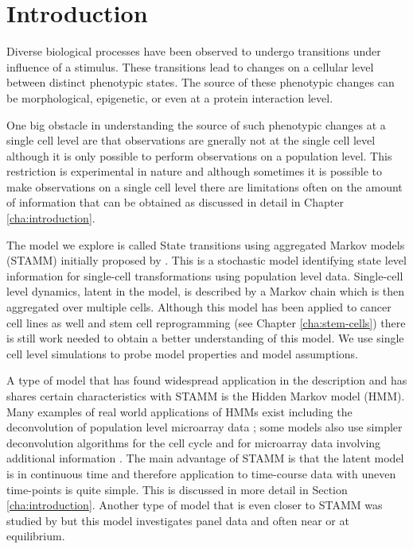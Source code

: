 \section{Introduction}
\label{sec:intro-stamm}

Diverse biological processes have been observed to undergo transitions under influence of a stimulus. These transitions lead to changes on a cellular level between distinct phenotypic states. The source of these phenotypic changes can be morphological, epigenetic, or even at a protein interaction level.

One big obstacle in understanding the source of such phenotypic changes at a single cell level are that observations are gnerally not at the single cell level although it is only possible to perform observations on a population level. This restriction is experimental in nature and although sometimes it is possible to make observations on a single cell level there are limitations often on the amount of information that can be obtained as discussed in detail in Chapter \ref{cha:introduction}. 

The model we explore is called State transitions using aggregated Markov models (STAMM) initially proposed by \cite{Armond:2013}. This is a stochastic model identifying  state level information for single-cell transformations using population level data. Single-cell level dynamics, latent in the model, is described by a Markov chain which is then aggregated over multiple cells. Although this model has been applied to cancer cell lines as well \cite{Casale:2013} and stem cell reprogramming (see Chapter \ref{cha:stem-cells}) there is still work needed to obtain a better understanding of this model. We use single cell level simulations to probe model properties and model assumptions. 

A type of model that has found widespread application in the description and has shares certain characteristics with STAMM is the Hidden Markov model (HMM). Many examples of real world applications of HMMs exist including the deconvolution of population level microarray data \citep{Roy:2006ik}; some models also use simpler deconvolution algorithms for the cell cycle and for microarray data involving additional information \citep{Bar-Joseph04082004, BarJoseph:2008bx}. The main advantage of STAMM is that the latent model is in continuous time and therefore application to time-course data with uneven time-points is quite simple. This is discussed in more detail in Section \ref{cha:introduction}. Another type of model that is even closer to STAMM was studied by \cite{Kalbfleisch:1983vd} but this model investigates panel data and often near or at equilibrium. 

